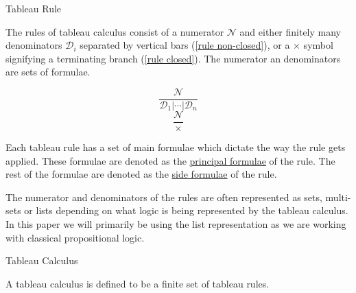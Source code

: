 \documentclass{llncs}
\newcommand{\comment}[1]{}
\begin{document}
\begin{definition}{Tableau Rule}\label{Tableau Rule}

The rules of tableau calculus consist of a numerator $\mathcal{N}$ and
either finitely many denominators $\mathcal{D}_i$ separated by vertical bars
(\ref{rule non-closed}), or a $\times$ symbol signifying a terminating branch
(\ref{rule closed}).  The numerator an denominators are sets of formulae.

\comment{
The rules of a tableau calculus are expressed as sets, multi-sets or lists
depending on the logic being expressed. We will express the tableau rules as a
list as we are primarily working with classical propositional logic. A rule is
composed of a numerator and a denominator. A numerator $\mathcal{N}$ is a set
of formulae in the logical system $L$. A denominator is either a set of
branches, $\mathcal{D}_i$, which are each sets of formulae in $L$ or the symbol
$\times$ signifying a closed tableau, indicated the termination of a branch.
These rules are typically written as the following where (\ref{rule
non-closed}) represents a rule with a denominator as a set of formulae and
(\ref{rule closed}) represents a rule which results in a closed branch,
}

\begin{multicols}{2}
\noindent
\begin{equation}
\frac{\mathcal{N}}{\mathcal{D}_1 \vert \cdots \vert \mathcal{D}_n}
\label{rule non-closed}
\end{equation}
\begin{equation}
\frac{\mathcal{N}}{\times}
\label{rule closed}
\end{equation}
\end{multicols}

Each tableau rule has a set of main formulae which dictate the way the rule
gets applied. These formulae are denoted as the \underline{principal formulae}
of the rule. The rest of the formulae are denoted as the \underline{side
formulae} of the rule.

The numerator and denominators of the rules are often represented as sets,
multi-sets or lists depending on what logic is being represented by the tableau
calculus. In this paper we will primarily be using the list representation as
we are working with classical propositional logic.
\end{definition}

\begin{definition}{Tableau Calculus}

A tableau calculus is defined to be a finite set of tableau rules.
\end{definition}
\end{document}
